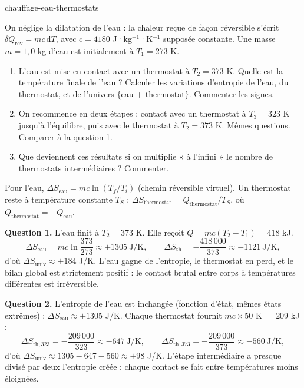 \begin{exo}{chauffage-eau-thermostats}

On néglige la dilatation de l'eau : la chaleur reçue de façon réversible s'écrit $\delta Q_{\text{rev}} = mc\,\mathrm{d}T$, avec $c = 4180$ J·kg$^{-1}$·K$^{-1}$ supposée constante. Une masse $m = 1{,}0$ kg d'eau est initialement à $T_1 = 273$ K.

\begin{enumerate}
\item L'eau est mise en contact avec un thermostat à $T_2 = 373$ K. Quelle est la température finale de l'eau ? Calculer les variations d'entropie de l'eau, du thermostat, et de l'univers $\{$eau + thermostat$\}$. Commenter les signes.
\item On recommence en deux étapes : contact avec un thermostat à $T_3 = 323$ K jusqu'à l'équilibre, puis avec le thermostat à $T_2 = 373$ K. Mêmes questions. Comparer à la question 1.
\item Que deviennent ces résultats si on multiplie « à l'infini » le nombre de thermostats intermédiaires ? Commenter.
\end{enumerate}

\begin{indication}
Pour l'eau, $\Delta S_{\text{eau}} = mc\ln(T_f/T_i)$ (chemin réversible virtuel). Un thermostat reste à température constante $T_S$ : $\Delta S_{\text{thermostat}} = Q_{\text{thermostat}}/T_S$, où $Q_{\text{thermostat}} = -Q_{\text{eau}}$.
\end{indication}

\begin{solution}
\textbf{Question 1.} L'eau finit à $T_2 = 373$ K. Elle reçoit $Q = mc(T_2 - T_1) = 418$ kJ.
\[
\Delta S_{\text{eau}} = mc\ln\frac{373}{273} \approx +1305\ \text{J/K}, \qquad
\Delta S_{\text{th}} = -\frac{418\,000}{373} \approx -1121\ \text{J/K},
\]
d'où $\Delta S_{\text{univ}} \approx +184$ J/K. L'eau gagne de l'entropie, le thermostat en perd, et le bilan global est strictement positif : le contact brutal entre corps à températures différentes est irréversible.

\textbf{Question 2.} L'entropie de l'eau est inchangée (fonction d'état, mêmes états extrêmes) : $\Delta S_{\text{eau}} \approx +1305$ J/K. Chaque thermostat fournit $mc\times50$ K $= 209$ kJ :
\[
\Delta S_{\text{th},323} = -\frac{209\,000}{323} \approx -647\ \text{J/K}, \qquad
\Delta S_{\text{th},373} = -\frac{209\,000}{373} \approx -560\ \text{J/K},
\]
d'où $\Delta S_{\text{univ}} \approx 1305 - 647 - 560 \approx +98$ J/K. L'étape intermédiaire a presque divisé par deux l'entropie créée : chaque contact se fait entre températures moins éloignées.


\end{solution}
\end{exo}
